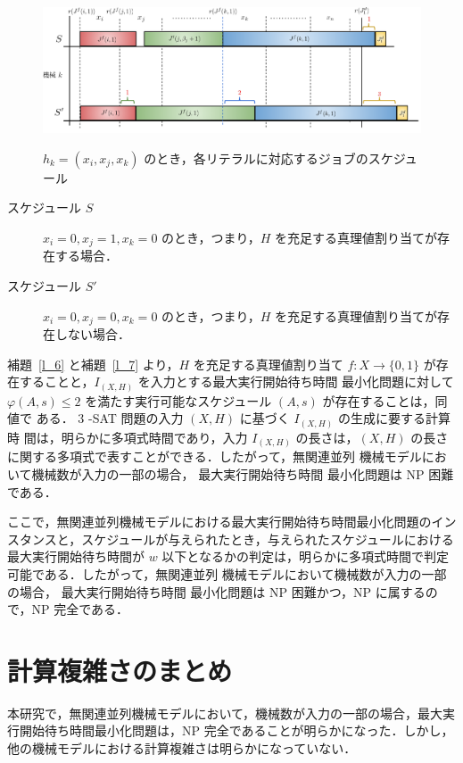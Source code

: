 \documentclass[12pt]{optlab-bachelor}
\begin{document}
\begin{figure}[h]
  \centering
  \includegraphics[width = 16cm]{figure/3SAT2.pdf}\\
  \caption{$h_k = (x_i, x_j, x_k)$ のとき，各リテラルに対応するジョブのスケジュール}
\end{figure}

\begin{description}
  \item[スケジュール $S$ ] $x_i = 0, x_j = 1, x_k = 0$ のとき，つまり，$H$ を充足する真理値割り当てが存在する場合．
  \item[スケジュール $S'$ ] $x_i = 0, x_j = 0, x_k = 0$ のとき，つまり，$H$ を充足する真理値割り当てが存在しない場合．
\end{description}

補題~\ref{l_6} と補題~\ref{l_7} より，$H$ を充足する真理値割り当て $f : X \to \{0,
1\}$ が存在することと，$I_{(X,H)}$ を入力とする最大実行開始待ち時間
最小化問題に対して $\varphi(A,s) \le 2$
を満たす実行可能なスケジュール $(A,s)$ が存在することは，同値で
ある．
3 -SAT 問題の入力 $(X,H)$ に基づく $I_{(X,H)}$ の生成に要する計算時
間は，明らかに多項式時間であり，入力 $I_{(X,H)}$ の長さは，$(X, H)$
の長さに関する多項式で表すことができる．したがって，無関連並列
機械モデルにおいて機械数が入力の一部の場合， 最大実行開始待ち時間
最小化問題は NP 困難である．

ここで，無関連並列機械モデルにおける最大実行開始待ち時間最小化問題のインスタンスと，スケジュールが与えられたとき，与えられたスケジュールにおける最大実行開始待ち時間が $w$ 以下となるかの判定は，明らかに多項式時間で判定可能である．したがって，無関連並列
機械モデルにおいて機械数が入力の一部の場合， 最大実行開始待ち時間
最小化問題は NP 困難かつ，NP に属するので，NP 完全である．

\section{計算複雑さのまとめ}\label{4_s_2}
本研究で，無関連並列機械モデルにおいて，機械数が入力の一部の場合，最大実行開始待ち時間最小化問題は，NP 完全であることが明らかになった．しかし，他の機械モデルにおける計算複雑さは明らかになっていない．
\end{document}
